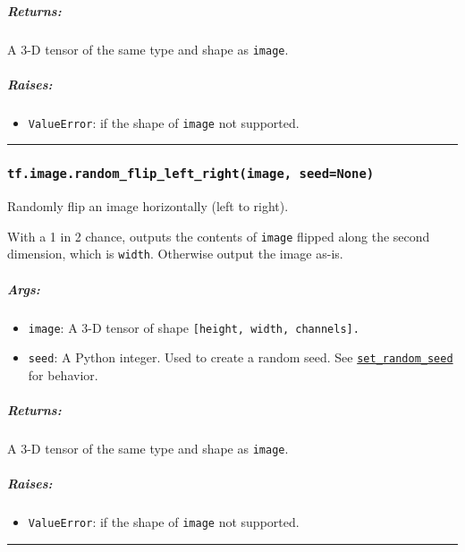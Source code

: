 \subparagraph{Returns: }\label{returns-16}

A 3-D tensor of the same type and shape as \texttt{image}.

\subparagraph{Raises: }\label{raises-6}

\begin{itemize}
\tightlist
\item
  \texttt{ValueError}: if the shape of \texttt{image} not supported.
\end{itemize}

\begin{center}\rule{0.5\linewidth}{\linethickness}\end{center}

\subsubsection{\texorpdfstring{\texttt{tf.image.random\_flip\_left\_right(image,\ seed=None)}
}{tf.image.random\_flip\_left\_right(image, seed=None) }}\label{tf.image.randomux5fflipux5fleftux5frightimage-seednone}

Randomly flip an image horizontally (left to right).

With a 1 in 2 chance, outputs the contents of \texttt{image} flipped
along the second dimension, which is \texttt{width}. Otherwise output
the image as-is.

\subparagraph{Args: }\label{args-17}

\begin{itemize}
\tightlist
\item
  \texttt{image}: A 3-D tensor of shape
  \texttt{{[}height,\ width,\ channels{]}.}
\item
  \texttt{seed}: A Python integer. Used to create a random seed. See
  \href{../../api_docs/python/constant_op.md\#set_random_seed}{\texttt{set\_random\_seed}}
  for behavior.
\end{itemize}

\subparagraph{Returns: }\label{returns-17}

A 3-D tensor of the same type and shape as \texttt{image}.

\subparagraph{Raises: }\label{raises-7}

\begin{itemize}
\tightlist
\item
  \texttt{ValueError}: if the shape of \texttt{image} not supported.
\end{itemize}

\begin{center}\rule{0.5\linewidth}{\linethickness}\end{center}

